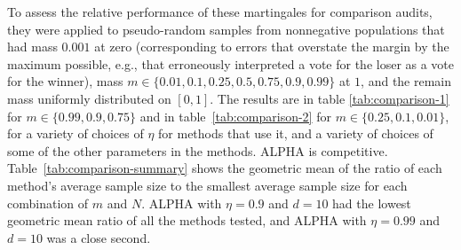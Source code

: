 \documentclass[aoas]{imsart}
\begin{document}
To assess the relative performance of these martingales for comparison audits, they were applied to
pseudo-random samples from nonnegative populations that had mass $0.001$ at zero (corresponding to errors that overstate the
margin by the maximum possible, e.g., that erroneously interpreted a vote for the loser as a vote for the winner), 
mass $m \in \{0.01, 0.1, 0.25, 0.5, 0.75, 0.9, 0.99\}$
at $1$, and the remain mass uniformly distributed on $[0, 1]$.
The results are in table \ref{tab:comparison-1} for $m \in \{0.99, 0.9, 0.75\}$ and 
in table~\ref{tab:comparison-2} for $m \in \{0.25, 0.1, 0.01\}$,
for a variety of choices of $\eta$ for methods that use it, and a variety of choices of some of the other parameters
in the methods.
ALPHA is competitive.
Table~\ref{tab:comparison-summary} shows the geometric mean of the ratio of each method's average sample size
to the smallest average sample size for each combination of $m$ and $N$.
ALPHA with $\eta=0.9$ and $d=10$ had the lowest geometric mean ratio of all the methods tested,
and ALPHA with $\eta=0.99$ and $d=10$ was a close second.
\end{document}
